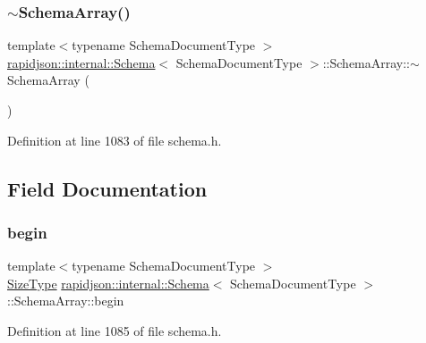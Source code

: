 \subsubsection{\texorpdfstring{$\sim$SchemaArray()}{~SchemaArray()}}
{\footnotesize\ttfamily template$<$typename Schema\+Document\+Type $>$ \\
\mbox{\hyperlink{classrapidjson_1_1internal_1_1_schema}{rapidjson\+::internal\+::\+Schema}}$<$ Schema\+Document\+Type $>$\+::Schema\+Array\+::$\sim$\+Schema\+Array (\begin{DoxyParamCaption}{ }\end{DoxyParamCaption})}



Definition at line 1083 of file schema.\+h.


\begin{DoxyCode}{0}

\end{DoxyCode}


\subsection{Field Documentation}
\mbox{\label{structrapidjson_1_1internal_1_1_schema_1_1_schema_array_a8cd7516e77f1c26ad90d5e876c4de3b4}} 
\subsubsection{\texorpdfstring{begin}{begin}}
{\footnotesize\ttfamily template$<$typename Schema\+Document\+Type $>$ \\
\mbox{\hyperlink{namespacerapidjson_a44eb33eaa523e36d466b1ced64b85c84}{Size\+Type}} \mbox{\hyperlink{classrapidjson_1_1internal_1_1_schema}{rapidjson\+::internal\+::\+Schema}}$<$ Schema\+Document\+Type $>$\+::Schema\+Array\+::begin}



Definition at line 1085 of file schema.\+h.



